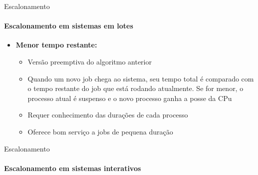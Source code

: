\documentclass{beamer}
\begin{document}
\begin{frame}{Escalonamento}
	\framesubtitle{Escalonamento em sistemas em lotes}
	\begin{itemize}
		\item \textbf{Menor tempo restante:}
		\begin{itemize}
			\item Versão preemptiva do algoritmo anterior
			\item Quando um novo job chega ao sistema, seu tempo total é comparado com o tempo restante do job que está rodando atualmente. Se for menor, o processo atual é suspenso e o novo processo ganha a posse da CPu
			\item Requer conhecimento das durações de cada processo
			\item Oferece bom serviço a jobs de pequena duração
		\end{itemize}
	\end{itemize}
\end{frame}
\begin{frame}{Escalonamento}
	\framesubtitle{Escalonamento em sistemas interativos}
\end{frame}
\end{document}
